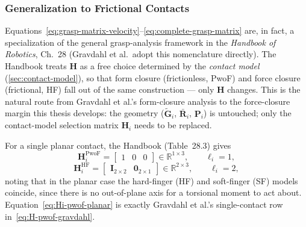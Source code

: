 \subsubsection{Generalization to Frictional Contacts}
\label{sec:grasp-matrix-handbook}

Equations~\eqref{eq:grasp-matrix-velocity}--\eqref{eq:complete-grasp-matrix} are, in
fact, a specialization of the general grasp-analysis framework in the
\emph{Handbook of Robotics}, Ch.~28 \cite{prattichizzo2008grasping}
(Gravdahl et al.\ adopt this nomenclature directly). The Handbook treats $\boldsymbol{H}$
as a free choice determined by the \emph{contact model}
(\cref{sec:contact-model}), so that form closure
(frictionless, PwoF) and force closure (frictional, HF) fall out of the same
construction --- only $\boldsymbol{H}$ changes. This is the natural route from
Gravdahl et al.'s form-closure analysis to the force-closure margin this
thesis develops: the geometry ($\tilde{\boldsymbol{G}}_i$, $\bar{\boldsymbol{R}}_i$,
$\boldsymbol{P}_i$) is untouched; only the contact-model selection matrix
$\boldsymbol{H}_i$ needs to be replaced.

For a single planar contact, the Handbook (Table~28.3) gives
\begin{equation}
    \boldsymbol{H}_i^{\mathrm{PwoF}} = \begin{bmatrix} 1 & 0 & 0 \end{bmatrix} \in \mathbb{R}^{1\times3} , \qquad \ell_i = 1 ,
    \label{eq:Hi-pwof-planar}
\end{equation}
\begin{equation}
    \boldsymbol{H}_i^{\mathrm{HF}} = \begin{bmatrix} \boldsymbol{I}_{2\times2} & \boldsymbol{0}_{2\times1} \end{bmatrix} \in \mathbb{R}^{2\times3} , \qquad \ell_i = 2 ,
    \label{eq:Hi-hf-planar}
\end{equation}
noting that in the planar case the hard-finger (HF) and soft-finger (SF)
models coincide, since there is no out-of-plane axis for a torsional moment
to act about. Equation~\eqref{eq:Hi-pwof-planar} is exactly
Gravdahl et al.'s single-contact row in~\eqref{eq:H-pwof-gravdahl}.

